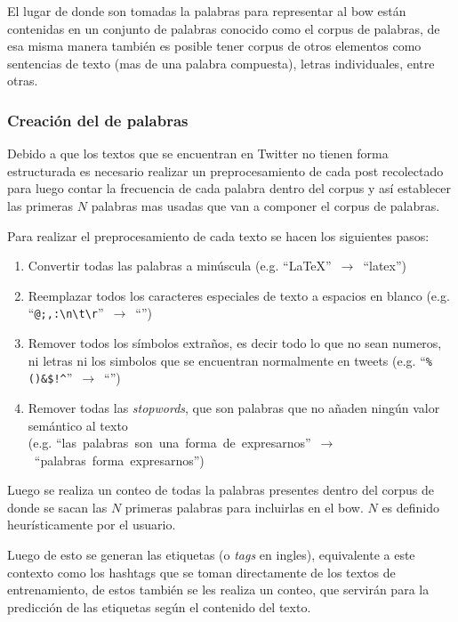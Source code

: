 El lugar de donde son tomadas la palabras para representar al \gls{bow} están contenidas en un conjunto de palabras conocido como el \gls{corpus} de palabras, de esa misma manera también es posible tener \gls{corpus} de otros elementos como sentencias de texto (mas de una palabra compuesta), letras individuales, entre otras.


\subsubsection{Creación del  de palabras}
Debido a que los textos que se encuentran en Twitter no tienen forma estructurada es necesario realizar un preprocesamiento de cada post recolectado para luego contar la frecuencia de cada palabra dentro del \gls{corpus} y así establecer las primeras $N$ palabras mas usadas que van a componer el \gls{corpus} de palabras.

Para realizar el preprocesamiento de cada texto se hacen los siguientes pasos:
\begin{enumerate}
\item Convertir todas las palabras a minúscula (e.g. \mbox{``LaTeX'' $\rightarrow$ ``latex''})
\item Reemplazar todos los caracteres especiales de texto a espacios en blanco (e.g. \mbox{``\texttt{@;,:\textbackslash n\textbackslash t\textbackslash r}'' $\rightarrow$ ``\textvisiblespace \textvisiblespace \textvisiblespace \textvisiblespace \textvisiblespace \textvisiblespace \textvisiblespace''})
\item Remover todos los símbolos extraños, es decir todo lo que no sean numeros, ni letras ni los simbolos que se encuentran normalmente en tweets (e.g. \mbox{``\texttt{\%()\*\&\$!\^}'' $\rightarrow$ ``''})
\item Remover todas las \emph{stopwords}, que son palabras que no añaden ningún valor semántico al texto \\ (e.g. \mbox{``las palabras son una forma de expresarnos'' $\rightarrow$ ``palabras forma expresarnos''})
\end{enumerate}

Luego se realiza un conteo de todas la palabras presentes dentro del \gls{corpus} de donde se sacan las $N$ primeras palabras para incluirlas en el \gls{bow}. $N$ es definido heurísticamente por el usuario.

Luego de esto se generan las etiquetas (o \emph{tags} en ingles), equivalente a este contexto como los hashtags que se toman directamente de los textos de entrenamiento, de estos también se les realiza un conteo, que servirán para la predicción de las etiquetas según el contenido del texto.

